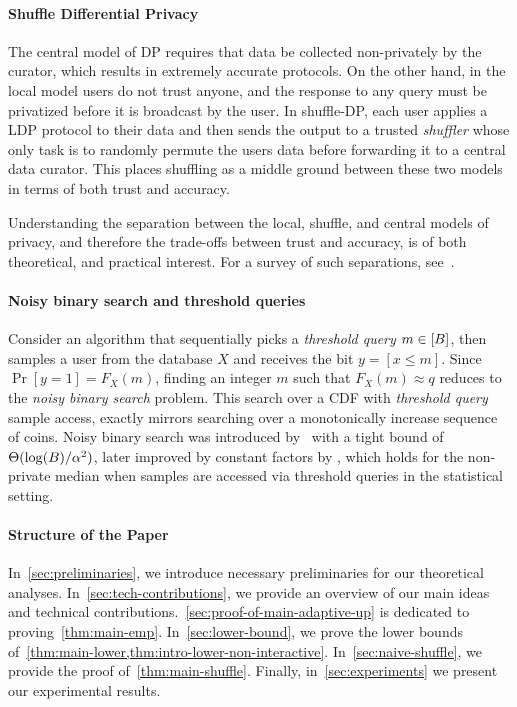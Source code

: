 \paragraph{Shuffle Differential Privacy}
The central model of DP requires that data be collected non-privately by the curator, which
results in extremely accurate protocols. %
On the other hand, in the local model users do not trust anyone, and the response to any query must be privatized before it is broadcast by the user. In shuffle-DP, each user applies a LDP protocol to their data and then sends the output to a trusted \emph{shuffler} whose only task is to randomly permute the users data before forwarding it to a central data curator. This places shuffling as a middle ground between these two models in terms of both trust and accuracy. 

%
Understanding the separation between the local, shuffle, and central models of privacy, and therefore the trade-offs between trust and accuracy, is of both theoretical, and practical interest. For a survey of such separations, see~\cite{cheu2021differential}. 

\paragraph{Noisy binary search and threshold queries} Consider an algorithm that sequentially picks a \textit{threshold query} $m\in[B]$, then samples a user from the database $X$ and receives the bit $y=[x\leq m]$. Since $\Pr[y = 1] = F_X(m)$, finding an integer $m$ such that $F_X(m) \approx q$ reduces to the \textit{noisy binary search} problem. This search over a CDF with \textit{threshold query} sample access, exactly mirrors searching over a monotonically increase sequence of coins. Noisy binary search was introduced by~\cite{karp2007noisy} with a tight bound of $\Theta(\log(B)/\alpha^2)$, later improved by constant factors by \cite{gretta2023sharp}, which holds for the non-private median when samples are accessed via threshold queries in the statistical setting. 

%

%
%
%
%

%
%

%


\paragraph{Structure of the Paper}
In~\cref{sec:preliminaries}, we introduce necessary preliminaries for our theoretical analyses. In~\cref{sec:tech-contributions}, we provide an overview of our main ideas and technical contributions.~\cref{sec:proof-of-main-adaptive-up} is dedicated to proving~\cref{thm:main-emp}. In~\cref{sec:lower-bound}, we prove the lower bounds of~\cref{thm:main-lower,thm:intro-lower-non-interactive}. In~\cref{sec:naive-shuffle}, we provide the proof of~\cref{thm:main-shuffle}. Finally, in~\cref{sec:experiments} we present our experimental results.

